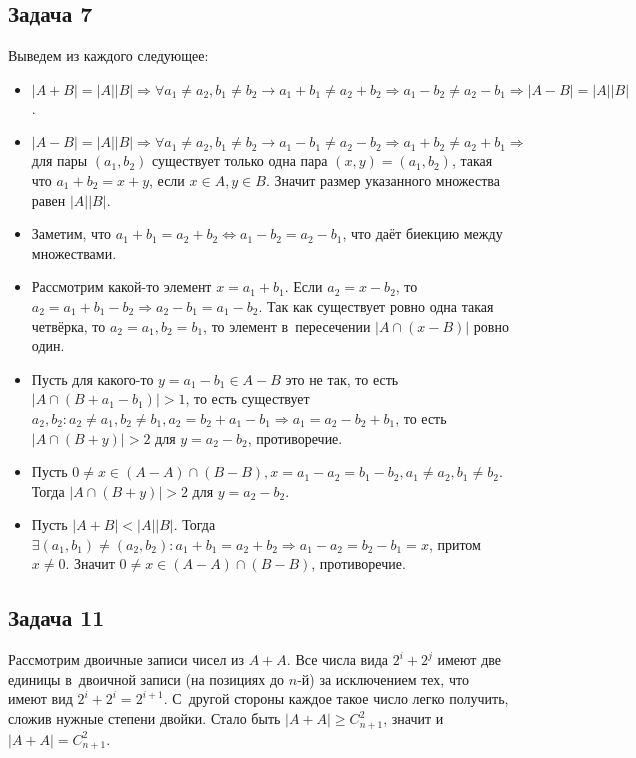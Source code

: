 \documentclass{article}
\begin{document}
\subsection*{Задача 7}
	Выведем из каждого следующее:
	\begin{itemize}
		\item $|A + B| = |A||B| \Rightarrow \forall a_1 \ne a_2, b_1 \ne b_2
			\rightarrow a_1 + b_1 \ne a_2 + b_2 \Rightarrow a_1 - b_2 \ne a_2 - b_1
			\Rightarrow |A - B| = |A||B|$.
		\item $|A - B| = |A||B| \Rightarrow \forall a_1 \ne a_2, b_1 \ne b_2
			\rightarrow a_1 - b_1 \ne a_2 - b_2 \Rightarrow a_1 + b_2 \ne a_2 + b_1
			\Rightarrow$ для пары $(a_1, b_2)$ существует только одна пара $(x, y) =
			(a_1, b_2)$, такая что $a_1 + b_2 = x + y$, если $x \in A, y \in B$.
			Значит размер указанного множества равен $|A||B|$.
		\item Заметим, что $a_1 + b_1 = a_2 + b_2 \Leftrightarrow a_1 - b_2 = a_2 -
			b_1$, что даёт биекцию между множествами.
		\item Рассмотрим какой-то элемент $x = a_1 + b_1$. Если $a_2 = x - b_2$, то
			$a_2 = a_1 + b_1 - b_2 \Rightarrow a_2 - b_1 = a_1 - b_2$. Так как
			существует ровно одна такая четвёрка, то $a_2 = a_1, b_2 = b_1$, то
			элемент в~пересечении $|A \cap (x - B)|$ ровно один.
		\item Пусть для какого-то $y = a_1 - b_1 \in A - B$ это не так, то есть $|A
			\cap (B + a_1 - b_1)| > 1$, то есть существует $a_2, b_2: a_2 \ne a_1, b_2
			\ne b_1, a_2 = b_2 + a_1 - b_1 \Rightarrow a_1 = a_2 - b_2 + b_1$, то есть
			$|A \cap (B + y)| > 2$ для $y = a_2 - b_2$, противоречие.
		\item Пусть $0 \ne x \in (A - A) \cap (B - B), x = a_1 - a_2 = b_1 - b_2,
			a_1 \ne a_2, b_1 \ne b_2$. Тогда $|A \cap (B + y)| > 2$ для $y = a_2 -
			b_2$.
		\item Пусть $|A + B| < |A||B|$. Тогда $\exists (a_1, b_1) \ne (a_2, b_2):
			a_1 + b_1 = a_2 + b_2 \Rightarrow a_1 - a_2 = b_2 - b_1 = x$, притом $x
			\ne 0$. Значит $0 \ne x \in (A - A) \cap (B - B)$, противоречие.
	\end{itemize}

\subsection*{Задача 11}
	Рассмотрим двоичные записи чисел из $A + A$. Все числа вида $2^i + 2^j$ имеют
	две единицы в~двоичной записи (на позициях до $n$-й) за исключением тех, что
	имеют вид $2^i + 2^i = 2^{i+1}$. С~другой стороны каждое такое число легко
	получить, сложив нужные степени двойки. Стало быть $|A + A| \ge C_{n+1}^2$,
	значит и~$|A + A| = C_{n+1}^2$.
\end{document}
